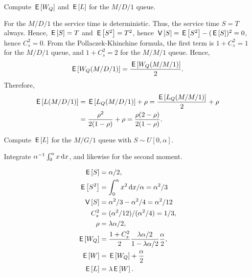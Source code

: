 \begin{extra}
  Compute $\,\mathsf{E}\left[W_Q\right]$ and $\,\mathsf{E}\left[L\right]$ for the $M/D/1$ queue.
\begin{solution}
  For the $M/D/1$ the service time is deterministic.
  Thus, the service time $S=T$ always.
  Hence, $\,\mathsf{E}\left[S\right] = T$ and $\,\mathsf{E}\left[S^2\right]=T^2$, hence $\,\mathsf{V}\left[S\right] = \,\mathsf{E}\left[S^2\right] - (\,\mathsf{E}\left[S\right])^2 = 0$, hence $C_s^2 = 0$.
  From the Pollaczek-Khinchine formula, the first term is $1+C_s^2=1$ for the $M/D/1$ queue, and $1+C_s^2=2$ for the $M/M/1$ queue.
  Hence,
  \begin{equation*}
\,\mathsf{E}\left[W_Q(M/D/1)\right] = \frac{\,\mathsf{E}\left[W_Q(M/M/1)\right]}2.
\end{equation*}
Therefore,
\begin{align*}
 \,\mathsf{E}\left[L(M/D/1)\right] &= \,\mathsf{E}\left[L_Q(M/D/1)\right] +\rho = \frac{\,\mathsf{E}\left[L_Q(M/M/1)\right]}2 + \rho \\
&= \frac{\rho^2}{2(1-\rho)} + \rho=\frac{\rho(2-\rho)} {2(1-\rho)}.
\end{align*}
\end{solution}
\end{extra}

\begin{extra}
  Compute $\,\mathsf{E}\left[L\right]$ for the $M/G/1$ queue with $S\sim U[0,\alpha]$.
\begin{hint}
Integrate $\alpha^{-1} \int_0^\alpha x \,\text{d}x$, and likewise for the second moment.
\end{hint}
\begin{solution}
  \begin{align*}
\,\mathsf{E}\left[S\right] &= \alpha/2,\\
\,\mathsf{E}\left[S^2\right] &= \int_0^\alpha x^2 \,\text{d}x/\alpha = \alpha^2/3\\
\,\mathsf{V}\left[S\right] &= \alpha^2/3 - \alpha^2/4= \alpha^2/12\\
C_s^2 &= (\alpha^2/12)/(\alpha^2/4) = 1/3,\\
\rho &= \lambda \alpha/2,\\
\,\mathsf{E}\left[W_Q\right] &= \frac{1+C_s^2}2 \frac{\lambda \alpha/2}{1-\lambda \alpha/2}\frac \alpha2, \\
\,\mathsf{E}\left[W\right] &= \,\mathsf{E}\left[W_Q\right] + \frac \alpha2\\
\,\mathsf{E}\left[L\right] &= \lambda \,\mathsf{E}\left[W\right].
  \end{align*}
\end{solution}
\end{extra}

